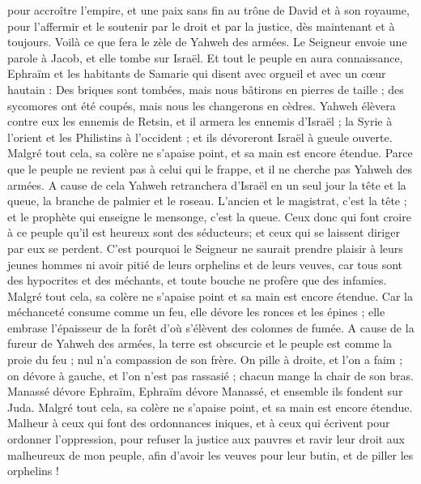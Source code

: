 \begin{multicols}{2}
pour accroître l'empire, et une paix sans fin au trône de David et à son royaume, pour l'affermir et le soutenir par le droit et par la justice, dès maintenant et à toujours. Voilà ce que fera le zèle de Yahweh des armées.
Le Seigneur envoie une parole à Jacob, et elle tombe sur Israël.
Et tout le peuple en aura connaissance, Ephraïm et les habitants de Samarie qui disent avec orgueil et avec un cœur hautain :
Des briques sont tombées, mais nous bâtirons en pierres de taille ; des sycomores ont été coupés, mais nous les changerons en cèdres.
Yahweh élèvera contre eux les ennemis de Retsin, et il armera les ennemis d'Israël ;
la Syrie à l'orient et les Philistins à l'occident ; et ils dévoreront Israël à gueule ouverte. Malgré tout cela, sa colère ne s'apaise point, et sa main est encore étendue.
Parce que le peuple ne revient pas à celui qui le frappe, et il ne cherche pas Yahweh des armées.
A cause de cela Yahweh retranchera d'Israël en un seul jour la tête et la queue, la branche de palmier et le roseau.
L'ancien et le magistrat, c'est la tête ; et le prophète qui enseigne le mensonge, c'est la queue.
Ceux donc qui font croire à ce peuple qu'il est heureux sont des séducteurs; et ceux qui se laissent diriger par eux se perdent.
C'est pourquoi le Seigneur ne saurait prendre plaisir à leurs jeunes hommes ni avoir pitié de leurs orphelins et de leurs veuves, car tous sont des hypocrites et des méchants, et toute bouche ne profère que des infamies. Malgré tout cela, sa colère ne s'apaise point et sa main est encore étendue.
Car la méchanceté consume comme un feu, elle dévore les ronces et les épines ; elle embrase l'épaisseur de la forêt d'où s'élèvent des colonnes de fumée.
A cause de la fureur de Yahweh des armées, la terre est obscurcie et le peuple est comme la proie du feu ; nul n'a compassion de son frère.
On pille à droite, et l'on a faim ; on dévore à gauche, et l'on n'est pas rassasié ; chacun mange la chair de son bras.
Manassé dévore Ephraïm, Ephraïm dévore Manassé, et ensemble ils fondent sur Juda. Malgré tout cela, sa colère ne s'apaise point, et sa main est encore étendue.
\VerseOne{}Malheur à ceux qui font des ordonnances iniques, et à ceux qui écrivent pour ordonner l'oppression,
pour refuser la justice aux pauvres et ravir leur droit aux malheureux de mon peuple, afin d'avoir les veuves pour leur butin, et de piller les orphelins !

\end{multicols}
